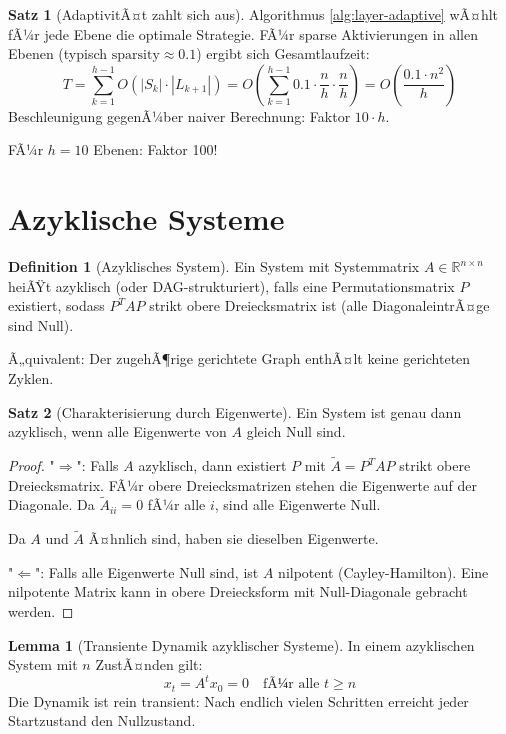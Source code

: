 ﻿\documentclass[a4paper,12pt]{report}
\theoremstyle{definition}
\newtheorem{definition}{Definition}
\newtheorem{satz}{Satz}
\newtheorem{lemma}{Lemma}
\begin{document}
	\begin{satz}[AdaptivitÃ¤t zahlt sich aus]
		Algorithmus \ref{alg:layer-adaptive} wÃ¤hlt fÃ¼r jede Ebene die optimale Strategie. FÃ¼r sparse Aktivierungen in allen Ebenen (typisch $\text{sparsity} \approx 0.1$) ergibt sich Gesamtlaufzeit:
		\[
		T = \sum_{k=1}^{h-1} O(|S_k| \cdot |L_{k+1}|) = O\left(\sum_{k=1}^{h-1} 0.1 \cdot \frac{n}{h} \cdot \frac{n}{h}\right) = O\left(\frac{0.1 \cdot n^2}{h}\right)
		\]
		Beschleunigung gegenÃ¼ber naiver Berechnung: Faktor $10 \cdot h$.
		
		FÃ¼r $h = 10$ Ebenen: Faktor 100!
	\end{satz}
	
	\section{Azyklische Systeme}
	
	\begin{definition}[Azyklisches System]
		Ein System mit Systemmatrix $A \in \mathbb{R}^{n \times n}$ heiÃŸt azyklisch (oder DAG-strukturiert), falls eine Permutationsmatrix $P$ existiert, sodass $P^T A P$ strikt obere Dreiecksmatrix ist (alle DiagonaleintrÃ¤ge sind Null).
		
		Ã„quivalent: Der zugehÃ¶rige gerichtete Graph enthÃ¤lt keine gerichteten Zyklen.
	\end{definition}
	
	\begin{satz}[Charakterisierung durch Eigenwerte]
		Ein System ist genau dann azyklisch, wenn alle Eigenwerte von $A$ gleich Null sind.
	\end{satz}
	
	\begin{proof}
		"$\Rightarrow$": Falls $A$ azyklisch, dann existiert $P$ mit $\tilde{A} = P^T A P$ strikt obere Dreiecksmatrix. FÃ¼r obere Dreiecksmatrizen stehen die Eigenwerte auf der Diagonale. Da $\tilde{A}_{ii} = 0$ fÃ¼r alle $i$, sind alle Eigenwerte Null.
		
		Da $A$ und $\tilde{A}$ Ã¤hnlich sind, haben sie dieselben Eigenwerte.
		
		"$\Leftarrow$": Falls alle Eigenwerte Null sind, ist $A$ nilpotent (Cayley-Hamilton). Eine nilpotente Matrix kann in obere Dreiecksform mit Null-Diagonale gebracht werden.
	\end{proof}
	
	\begin{lemma}[Transiente Dynamik azyklischer Systeme]
		In einem azyklischen System mit $n$ ZustÃ¤nden gilt:
		\[
		x_t = A^t x_0 = 0 \quad \text{fÃ¼r alle } t \geq n
		\]
		Die Dynamik ist rein transient: Nach endlich vielen Schritten erreicht jeder Startzustand den Nullzustand.
	\end{lemma}
	
\end{document}
